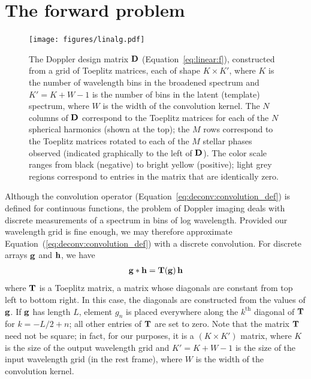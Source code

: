 \documentclass[modern]{aastex631}
\begin{document}
\section{The forward problem}
\label{sec:linear}

\begin{figure}[ht!]
    \begin{centering}
        \texttt{[image: figures/linalg.pdf]}
        \caption{%
            The Doppler design matrix ${\mathbf{D}}$ (Equation~\ref{eq:linear:f}), constructed from a grid of Toeplitz matrices, each of shape $K \times K'$, where $K$ is the number of wavelength bins in the broadened spectrum and $K' = K + W - 1$ is the number of bins in the latent (template) spectrum, where $W$ is the width of the convolution kernel.
            The $N$ columns of ${\mathbf{D}}$ correspond to the Toeplitz matrices for each of the $N$ spherical harmonics (shown at the top);
            the $M$ rows correspond to the Toeplitz matrices rotated to each of the $M$ stellar phases observed (indicated graphically to the left of ${\mathbf{D}}$).
            The color scale ranges from black (negative) to bright yellow (positive); light grey regions correspond to entries in the matrix that are identically zero.
        }
        \label{fig:linalg}
    \end{centering}
\end{figure}

Although the convolution operator (Equation~\ref{eq:deconv:convolution_def})
is defined for continuous functions, the problem of Doppler imaging deals with discrete measurements of a spectrum in bins of log wavelength. 
Provided our wavelength grid is fine enough, we may therefore approximate Equation~(\ref{eq:deconv:convolution_def}) with a discrete convolution.
For discrete arrays ${\mathbf{g}}$ and ${\mathbf{h}}$, we have
%
\begin{align}
    \label{eq:linear:convolution_def}
    {\ensuremath{\mathbf{g}}} * {\mathbf{h}} = {\mathbf{T(g)}} \, {\mathbf{h}}
\end{align}
%
where ${\mathbf{T}}$ is a Toeplitz matrix, a matrix whose diagonals are constant from top left to bottom right. 
In this case, the diagonals are constructed from the values of ${\mathbf{g}}$. 
If ${\mathbf{g}}$ has length $L$, element $g_n$ is placed everywhere along the $k^\mathrm{th}$ diagonal of ${\mathbf{T}}$ for $k = -L / 2 + n$; all other entries of ${\mathbf{T}}$ are set to zero. 
Note that the matrix ${\mathbf{T}}$ need not be square; in fact, for our purposes, it is a $(K \times K')$ matrix, where $K$ is the size of the output wavelength grid and $K' = K + W - 1$ is the size of the input wavelength grid (in the rest frame), where $W$ is the width of the convolution kernel.
\end{document}
